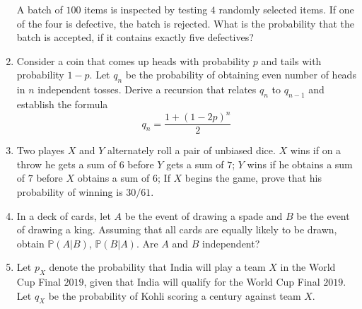 \documentclass{article}
\newcommand{\Pb}{\mathbb{P}}
\newcommand{\bkt}[1]{\left(#1\right)}
\begin{document}
\begin{enumerate}
		A batch of $100$ items is inspected by testing $4$ randomly selected items. If one of the four is defective, the batch is rejected. What is the probability that the batch is accepted, if it contains exactly five defectives?
		\item
		Consider a coin that comes up heads with probability $p$ and tails with probability $1-p$. Let $q_n$ be the probability of obtaining even number of heads in $n$ independent tosses. Derive a recursion that relates $q_n$ to $q_{n-1}$ and establish the formula
		$$q_n = \dfrac{1+\bkt{1-2p}^n}2$$
		\item
		Two playes $X$ and $Y$ alternately roll a pair of unbiased dice. $X$ wins if on a throw he gets a sum of $6$ before $Y$ gets a sum of $7$; $Y$ wins if he obtains a sum of $7$ before $X$ obtains a sum of $6$; If $X$ begins the game, prove that his probability of winning is $30/61$.
		\item
		In a deck of cards, let $A$ be the event of drawing a spade and $B$ be the event of drawing a king. Assuming that all cards are equally likely to be drawn, obtain $\Pb(A \vert B)$, $\Pb (B \vert A)$. Are $A$ and $B$ independent?
		\item
		Let $p_X$ denote the probability that India will play a team $X$ in the World Cup Final $2019$, given that India will qualify for the World Cup Final $2019$. Let $q_X$ be the probability of Kohli scoring a century against team $X$.


\end{enumerate}
\end{document}
